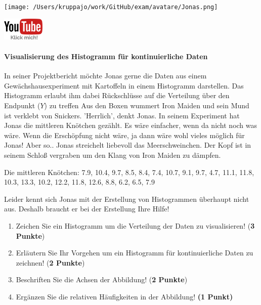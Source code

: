 \documentclass[a4paper, 9pt]{scrartcl}\usepackage[]{graphicx}\usepackage[]{xcolor}
\begin{document}
 
\begin{minipage}[t]{0.5\textwidth}
\texttt{[image: /Users/kruppajo/work/GitHub/exam/avatare/Jonas.png]}
\end{minipage}
\begin{minipage}[t]{0.5\textwidth}
\hfill
\href{https://youtu.be/ORHSPTCdfeY}{\includegraphics[width = 2cm]{img/youtube}}
\end{minipage}
\vspace{-3ex}



\paragraph{Visualisierung des Histogramm für kontinuierliche Daten}

In seiner Projektbericht möchte Jonas gerne die Daten aus einem Gewächshausexperiment mit Kartoffeln in einem Histogramm darstellen. Das Histogramm erlaubt ihm dabei Rückschlüsse auf die Verteilung über den Endpunkt ($Y$) zu treffen Aus den Boxen wummert Iron Maiden und sein Mund ist verklebt von Snickers. 'Herrlich', denkt Jonas. In seinem Experiment hat Jonas die mittleren Knötchen gezählt. Es wäre einfacher, wenn da nicht noch was wäre. Wenn die Erschöpfung nicht wäre, ja dann wäre wohl vieles möglich für Jonas! Aber so.. Jonas streichelt liebevoll das Meerschweinchen. Der Kopf ist in seinem Schloß vergraben um den Klang von Iron Maiden zu dämpfen.

\begin{center}
Die mittleren Knötchen: 7.9, 10.4, 9.7, 8.5, 8.4, 7.4, 10.7, 9.1, 9.7, 4.7, 11.1, 11.8, 10.3, 13.3, 10.2, 12.2, 11.8, 12.6, 8.8, 6.2, 6.5, 7.9
\end{center}

Leider kennt sich Jonas mit der Erstellung von Histogrammen überhaupt nicht aus. Deshalb braucht er bei der Erstellung Ihre Hilfe!

\begin{enumerate}
\item Zeichen Sie ein Histogramm um die Verteilung der Daten zu visualisieren! (\textbf{3 Punkte})
 \item Erläutern Sie Ihr Vorgehen um ein Histogramm für kontinuierliche Daten zu zeichnen!  (\textbf{2 Punkte})
\item Beschriften Sie die Achsen der Abbildung! (\textbf{2 Punkte})
\item Ergänzen Sie die relativen Häufigkeiten in der Abbildung! \textbf{(1 Punkt)}  
\end{enumerate}
\end{document}
